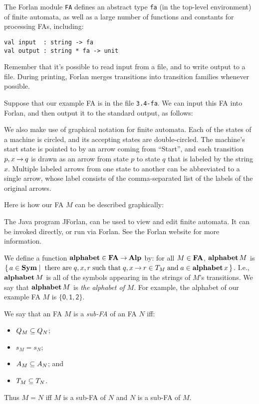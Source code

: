 The Forlan module \texttt{FA} defines an abstract type \texttt{fa} (in
%
%
the top-level environment) of finite automata, as well as a large
number of functions and constants for processing FAs, including:
\begin{verbatim}
val input  : string -> fa
val output : string * fa -> unit 
\end{verbatim}
%
%
Remember that it's possible to read input from a file, and to write
output to a file.  During printing, Forlan merges transitions into
transition families whenever possible.

Suppose that our example FA is in the file \texttt{3.4-fa}.
We can input this FA into Forlan, and then output it to the
standard output, as follows:


We also make use of graphical notation for finite automata.
Each of the states of a machine is circled,
and its accepting states are double-circled.  The machine's start state is
pointed to by an arrow coming from ``Start'', and
each transition $p, x\mathbin{\to} q$ is drawn as an arrow from state $p$
to state $q$ that is labeled by the string $x$.  Multiple labeled
arrows from one state to another can be abbreviated to a single
arrow, whose label consists of the comma-separated list of the
labels of the original arrows.

Here is how our FA $M$ can be described graphically:
\begin{center}

\end{center}

The Java program JForlan, can be used to view and edit finite
automata.  It can be invoked directly, or run via Forlan.  See the
Forlan website for more information.

%
%
We define a function $\mathbf{alphabet}\in\mathbf{FA}\mathbin{\to}\mathbf{Alp}$ by: for all $M\in\mathbf{FA}$,
$\mathbf{alphabet}\,M$ is $\{ \, a\in\mathbf{Sym} \mid \;\allowbreak\mbox{there are}\allowbreak\;q,x,r\;\allowbreak\mbox{such
    that}\allowbreak\; q,x\mathbin{\to} r\in T_M\;\allowbreak\mbox{and}\allowbreak\;a\in\mathbf{alphabet}\,x \, \}$.  I.e.,
$\mathbf{alphabet}\,M$ is all of the symbols appearing in the strings of $M$'s
transitions.  We say that $\mathbf{alphabet}\,M$ is \emph{the alphabet of}
$M$.  For example, the alphabet of our example FA $M$ is
$\{\mathsf{0,1,2}\}$.

%
We say that an FA $M$ is a \emph{sub-FA} of an FA $N$ iff:
\begin{itemize}
\item $Q_M\subseteq Q_N$;
\item $s_M = s_N$;
\item $A_M\subseteq A_N$; and
\item $T_M\subseteq T_N$.
\end{itemize}
Thus $M=N$ iff $M$ is a sub-FA of $N$ and $N$ is a sub-FA of $M$.

